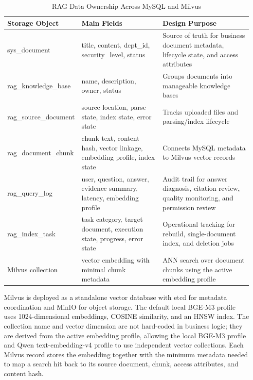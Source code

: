 \begin{table}[H]
\small\singlespacing
\centering
\caption{RAG Data Ownership Across MySQL and Milvus}
\label{tab:rag-data-ownership}
\vspace{2mm}

\begin{tabularx}{\textwidth}{>{\RaggedRight\arraybackslash}p{}>{\RaggedRight\arraybackslash}p{}>{\RaggedRight\arraybackslash}X}
\toprule
\textbf{Storage Object} & \textbf{Main Fields} & \textbf{Design Purpose} \\
\midrule
sys\_document & title, content, dept\_id, security\_level, status & Source of truth for business document metadata, lifecycle state, and access attributes \\
rag\_knowledge\_base & name, description, owner, status & Groups documents into manageable knowledge bases \\
rag\_source\_document & source location, parse state, index state, error state & Tracks uploaded files and parsing/index lifecycle \\
rag\_document\_chunk & chunk text, content hash, vector linkage, embedding profile, index state & Connects MySQL metadata to Milvus vector records \\
rag\_query\_log & user, question, answer, evidence summary, latency, embedding profile & Audit trail for answer diagnosis, citation review, quality monitoring, and permission review \\
rag\_index\_task & task category, target document, execution state, progress, error state & Operational tracking for rebuild, single-document index, and deletion jobs \\
Milvus collection & vector embedding with minimal chunk metadata & ANN search over document chunks using the active embedding profile \\
\bottomrule
\end{tabularx}
\end{table}

Milvus is deployed as a standalone vector database with etcd for metadata coordination and MinIO for object storage. The default local BGE-M3 profile uses 1024-dimensional embeddings, COSINE similarity, and an HNSW index. The collection name and vector dimension are not hard-coded in business logic; they are derived from the active embedding profile, allowing the local BGE-M3 profile and Qwen text-embedding-v4 profile to use independent vector collections. Each Milvus record stores the embedding together with the minimum metadata needed to map a search hit back to its source document, chunk, access attributes, and content hash.

